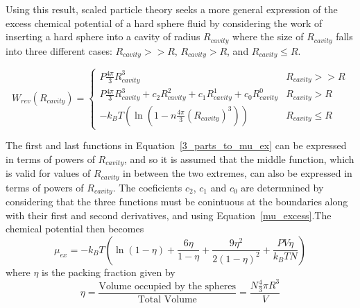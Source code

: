 \documentclass[12pt]{article}
\begin{document}
Using this result, scaled particle theory seeks a more general expression of the excess chemical potential of 
a hard sphere fluid by considering the work of inserting a hard sphere into a cavity of radius $R_{cavity}$ 
where the size of $R_{cavity}$ falls into three different cases: $R_{cavity} >> R$, $R_{cavity} > R$, and $R_{cavity} \leq R$. 

\begin{equation}\label{3_parts_to_mu_ex}{W_{rev}(R_{cavity})=\left\{ \begin{array}{rc} P\frac{4\pi}{3}R_{cavity}^3 & R_{cavity} >> R 
\\ P\frac{4\pi}{3}R_{cavity}^3 + c_2R_{cavity}^2 + c_1R_{cavity}^1 + c_0R_{cavity}^0  & R_{cavity} > R \\ -k_BT(\ln(1-n\frac{4\pi}{3}(R_{cavity})^3)) & R_{cavity} \leq R\end{array}\right.}\end{equation}


The first and last functions in Equation~\ref{3_parts_to_mu_ex} can be expressed in terms of powers of $R_{cavity}$, 
and so it is assumed that the middle function, which is valid for values of $R_{cavity}$ in between the two extremes, 
can also be expressed in terms of powers of $R_{cavity}$.  
The coeficients $c_2$, $c_1$ and $c_0$ are determnined by considering that the three functions must be conintuous at the boundaries along with their first and second derivatives, and using Equation~\ref{mu_excess}.The chemical potential then becomes
\begin{equation}\mu_{ex}=-k_BT\left(\ln(1-\eta) + \frac{6\eta}{1-\eta}+\frac{9\eta^2}{2(1-\eta)^2}+\frac{PV\eta}{k_BTN}\right)\end{equation}
where $\eta$ is the packing fraction given by
\begin{displaymath}\eta = \frac{\mbox{Volume occupied by the spheres}}{\mbox{Total Volume}}=\frac{N\frac{4}{3}\pi{R}^3}{V}\end{displaymath} 

\end{document}
